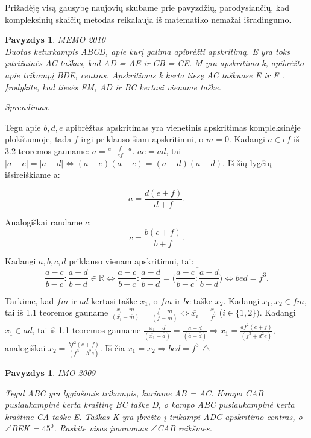 \documentclass[11pt,a4paper,twoside]{book}
\newenvironment{sprendimas}{\noindent \textit{Sprendimas.}}{\hfill $\triangle$}
\newcounter{foo}[subsection]
\newtheorem{pavnr}[foo]{Pavyzdys}
\theoremstyle{definition} \newtheorem*{api}{Apibrėžimas}
\theoremstyle{remark} \newtheorem*{pastaba}{Pastaba}
\begin{document}
Prižadėję visą gausybę naujovių skubame prie pavyzdžių, parodysiančių, kad
kompleksinių skaičių metodas reikalauja iš matematiko nemažai išradingumo.


\begin{pavnr} 
 MEMO 2010 
\\
Duotas keturkampis ABCD, apie kurį galima apibrėžti apskritimą. E yra toks įstrižainės AC
taškas, kad AD = AE ir CB = CE. M yra apskritimo k, apibrėžto apie trikampį BDE,
centras. Apskritimas k kerta tiesę AC taškuose E ir F . Įrodykite, kad tiesės FM, AD ir BC
kertasi viename taške.
\end{pavnr}
\begin{sprendimas}


Tegu apie $b, d, e$ apibrėžtas apskritimas yra vienetinis apskritimas kompleksinėje plokštumoje, tada $f$ irgi priklauso šiam apskritimui, o $m=0$. Kadangi $a\in ef$ iš 3.2 teoremos gauname: $\overline{a}=\frac{e+f-a}{ef}$. $ae = ad$, tai $|a-e|=|a-d| \Leftrightarrow (a-e)\overline{(a-e)}=(a-d)\overline{(a-d)}$. Iš šių lygčių išsireiškiame a:

\begin{equation*}
a=\frac{d(e+f)}{d+f}.
\end{equation*}

Analogiškai randame $c$:
\begin{equation*}
c=\frac{b(e+f)}{b+f}.
\end{equation*}

Kadangi $a,b,c,d$ priklauso vienam apskritimui, tai:
\begin{equation*}
\frac{a-c}{b-c}:\frac{a-d}{b-d}\in \mathbb{R} \Leftrightarrow \frac{a-c}{b-c}:\frac{a-d}{b-d}= \overline{\bigg(\frac{a-c}{b-c}:\frac{a-d}{b-d}\bigg)} \Leftrightarrow bed=f^3.
\end{equation*}

Tarkime, kad $ fm$ ir $ad$ kertasi taške $x_1$, o $fm$ ir $bc$ taške $x_2$. Kadangi $x_1, x_2 \in fm$, tai iš 1.1 teoremos gauname $\frac{x_i-m}{(\overline{x_i}-\overline{m})}=\frac{f-m}{(\overline{f}-\overline{m})} \Leftrightarrow          \overline{x_i}=\frac{x_i}{f^2}$ ($i \in \{1, 2\})$.
Kadangi $x_1 \in ad$, tai iš 1.1 teoremos gauname $\frac{x_1-d}{(\overline{x_1}-\overline{d})}=\frac{a-d}{(\overline{a}-\overline{d})} \Rightarrow x_1=\frac{df^2(e+f)}{(f^3+d^2e)}$,
analogiškai $x_2=\frac{bf^2(e+f)}{(f^3+b^2e)}$.
Iš čia $x_1=x_2 \Rightarrow bed=f^3$
\end{sprendimas}
\begin{pavnr}

IMO 2009

Tegul ABC yra lygiašonis trikampis, kuriame AB =
AC. Kampo CAB pusiaukampinė kerta kraštinę BC taške D, o kampo
ABC pusiaukampinė kerta kraštine CA taške E. Taškas K yra įbrėžto
į trikampi ADC apskritimo centras, o $\angle$BEK = $45^0$. Raskite visas
įmanomas $\angle$CAB reikšmes.
\end{pavnr}
\end{document}
